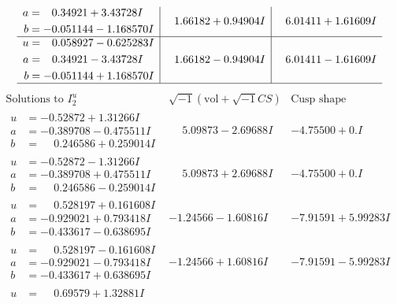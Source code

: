 \documentclass[1p]{elsarticle_modified}
\theoremstyle{definition}
\newcommand{\I}{\sqrt{-1}}
\begin{document}
$$\begin{array}{c|c|c}
\begin{aligned}
a &= \phantom{-}0.34921 + 3.43728 I \\
b &= -0.051144 - 1.168570 I\end{aligned}
 & \phantom{-}1.66182 + 0.94904 I & \phantom{-}6.01411 + 1.61609 I \\ \hline\begin{aligned}
u &= \phantom{-}0.058927 - 0.625283 I \\
a &= \phantom{-}0.34921 - 3.43728 I \\
b &= -0.051144 + 1.168570 I\end{aligned}
 & \phantom{-}1.66182 - 0.94904 I & \phantom{-}6.01411 - 1.61609 I\\
 \hline 
 \end{array}$$\newpage$$\begin{array}{c|c|c}  
\text{Solutions to }I^u_{2}& \I (\text{vol} + \sqrt{-1}CS) & \text{Cusp shape}\\
 \hline 
\begin{aligned}
u &= -0.52872 + 1.31266 I \\
a &= -0.389708 - 0.475511 I \\
b &= \phantom{-}0.246586 + 0.259014 I\end{aligned}
 & \phantom{-}5.09873 - 2.69688 I & -4.75500 + 0. I\phantom{ +0.000000I} \\ \hline\begin{aligned}
u &= -0.52872 - 1.31266 I \\
a &= -0.389708 + 0.475511 I \\
b &= \phantom{-}0.246586 - 0.259014 I\end{aligned}
 & \phantom{-}5.09873 + 2.69688 I & -4.75500 + 0. I\phantom{ +0.000000I} \\ \hline\begin{aligned}
u &= \phantom{-}0.528197 + 0.161608 I \\
a &= -0.929021 + 0.793418 I \\
b &= -0.433617 - 0.638695 I\end{aligned}
 & -1.24566 - 1.60816 I & -7.91591 + 5.99283 I \\ \hline\begin{aligned}
u &= \phantom{-}0.528197 - 0.161608 I \\
a &= -0.929021 - 0.793418 I \\
b &= -0.433617 + 0.638695 I\end{aligned}
 & -1.24566 + 1.60816 I & -7.91591 - 5.99283 I \\ \hline\begin{aligned}
u &= \phantom{-}0.69579 + 1.32881 I \\

\end{aligned}
\end{array}$$
\end{document}
